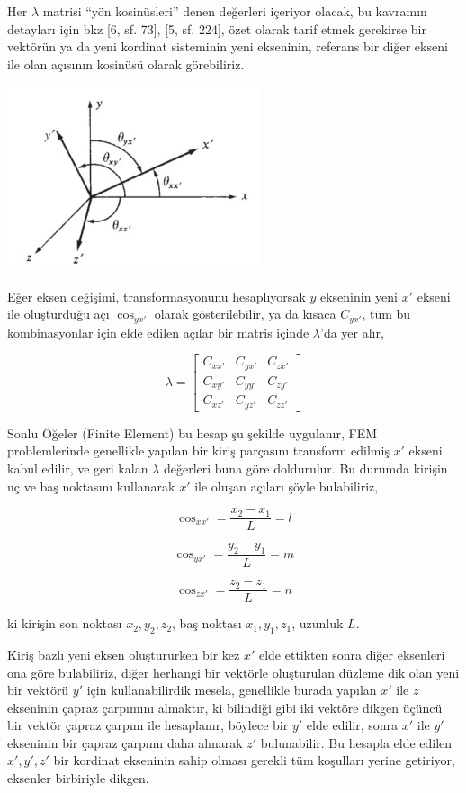 \documentclass[12pt,fleqn]{article}\usepackage{../../common}
\begin{document}
Her $\lambda$ matrisi ``yön kosinüsleri'' denen değerleri içeriyor olacak, bu
kavramın detayları için bkz [6, sf. 73], [5, sf. 224], özet olarak tarif etmek
gerekirse bir vektörün ya da yeni kordinat sisteminin yeni ekseninin, referans
bir diğer ekseni ile olan açısının kosinüsü olarak görebiliriz.

\includegraphics[width=20em]{phy_020_strs_11_04.jpg}

Eğer eksen değişimi, transformasyonunu hesaplıyorsak $y$ ekseninin yeni $x'$
ekseni ile oluşturduğu açı $\cos_{yx'}$ olarak gösterilebilir, ya da kısaca
$C_{yx'}$, tüm bu kombinasyonlar için elde edilen açılar bir matris içinde
$\lambda$'da yer alır,

$$
\lambda = \left[\begin{array}{ccc}
C_{xx'} & C_{yx'} & C_{zx'} \\
C_{xy'} & C_{yy'} & C_{zy'} \\
C_{xz'} & C_{yz'} & C_{zz'} 
\end{array}\right]
$$

Sonlu Öğeler (Finite Element) bu hesap şu şekilde uygulanır, FEM problemlerinde
genellikle yapılan bir kiriş parçasını transform edilmiş $x'$ ekseni kabul
edilir, ve geri kalan $\lambda$ değerleri buna göre doldurulur. Bu durumda
kirişin uç ve baş noktasını kullanarak $x'$ ile oluşan açıları şöyle
bulabiliriz,

$$
\cos_{xx'} = \frac{x_2 - x_1}{L} = l
$$

$$
\cos_{yx'} = \frac{y_2 - y_1}{L} = m
$$

$$
\cos_{zx'} = \frac{z_2 - z_1}{L} = n
$$

ki kirişin son noktası $x_2,y_2,z_2$, baş noktası $x_1,y_1,z_1$, uzunluk $L$.

Kiriş bazlı yeni eksen oluştururken bir kez $x'$ elde ettikten sonra diğer
eksenleri ona göre bulabiliriz, diğer herhangi bir vektörle oluşturulan düzleme
dik olan yeni bir vektörü $y'$ için kullanabilirdik mesela, genellikle burada
yapılan $x'$ ile $z$ ekseninin çapraz çarpımını almaktır, ki bilindiği gibi iki
vektöre dikgen üçüncü bir vektör çapraz çarpım ile hesaplanır, böylece bir $y'$
elde edilir, sonra $x'$ ile $y'$ ekseninin bir çapraz çarpımı daha alınarak $z'$
bulunabilir.  Bu hesapla elde edilen $x',y',z'$ bir kordinat ekseninin sahip
olması gerekli tüm koşulları yerine getiriyor, eksenler birbiriyle dikgen.
\end{document}
